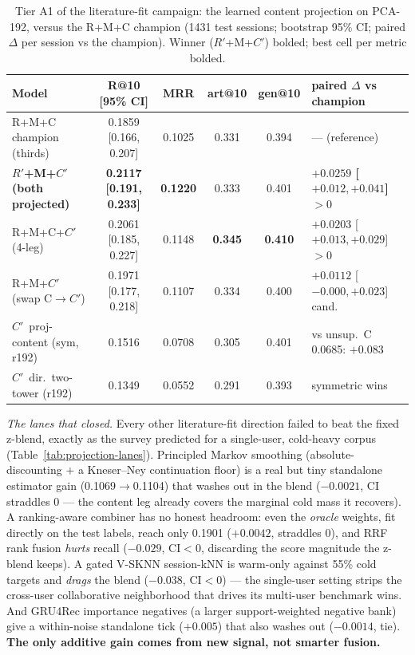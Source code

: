 \documentclass[11pt]{article}
\newcommand{\best}[1]{\textbf{#1}}
\newcommand{\Rp}{\ensuremath{R'}}
\newcommand{\Cp}{\ensuremath{C'}}
\begin{document}
\begin{table}[ht]
  \centering
  \caption{Tier A1 of the literature-fit campaign: the learned content projection
  on PCA-192, versus the R+M+C champion (\num{1431} test sessions; bootstrap 95\%
  CI; paired $\Delta$ per session vs the champion). Winner (\Rp+M+\Cp) bolded; best
  cell per metric bolded.}
  \label{tab:projection}
  {\footnotesize\setlength{\tabcolsep}{4pt}\begin{tabular}{lccccl}
    \toprule
    Model & R@10 [95\% CI] & MRR & art@10 & gen@10 & paired $\Delta$ vs champion \\
    \midrule
    R+M+C champion (thirds)           & 0.1859 [0.166, 0.207] & 0.1025 & 0.331 & 0.394 & --- (reference) \\
    \best{\Rp+M+\Cp (both projected)} & \best{0.2117 [0.191, 0.233]} & \best{0.1220} & 0.333 & 0.401 & \best{$+0.0259$ [$+0.012,+0.041$] $>0$} \\
    R+M+C+\Cp (4-leg)                 & 0.2061 [0.185, 0.227] & 0.1148 & \best{0.345} & \best{0.410} & $+0.0203$ [$+0.013,+0.029$] $>0$ \\
    R+M+\Cp (swap C$\to$\Cp)          & 0.1971 [0.177, 0.218] & 0.1107 & 0.334 & 0.400 & $+0.0112$ [$-0.000,+0.023$] cand. \\
    \Cp\ proj-content (sym, r192)     & 0.1516 & 0.0708 & 0.305 & 0.401 & vs unsup.\ C 0.0685: $+0.083$ \\
    \Cp\ dir.\ two-tower (r192)       & 0.1349 & 0.0552 & 0.291 & 0.393 & symmetric wins \\
    \bottomrule
  \end{tabular}}
\end{table}

\emph{The lanes that closed.} Every other literature-fit direction failed to beat
the fixed z-blend, exactly as the survey predicted for a single-user, cold-heavy
corpus (Table~\ref{tab:projection-lanes}). Principled Markov smoothing
(absolute-discounting $+$ a Kneser--Ney continuation floor) is a real but tiny
standalone estimator gain (\num{0.1069}$\to$\num{0.1104}) that washes out in the
blend ($-\num{0.0021}$, CI straddles 0 --- the content leg already covers the
marginal cold mass it recovers). A ranking-aware combiner has no honest headroom:
even the \emph{oracle} weights, fit directly on the test labels, reach only
\num{0.1901} ($+\num{0.0042}$, straddles 0), and RRF rank fusion \emph{hurts}
recall ($-\num{0.029}$, CI$<$0, discarding the score magnitude the z-blend keeps).
A gated V-SKNN session-kNN is warm-only against 55\% cold targets and \emph{drags}
the blend ($-\num{0.038}$, CI$<$0) --- the single-user setting strips the
cross-user collaborative neighborhood that drives its multi-user benchmark wins.
And GRU4Rec importance negatives (a larger support-weighted negative bank) give a
within-noise standalone tick ($+\num{0.005}$) that also washes out
($-\num{0.0014}$, tie). \textbf{The only additive gain comes from new signal, not
smarter fusion.}
\end{document}
